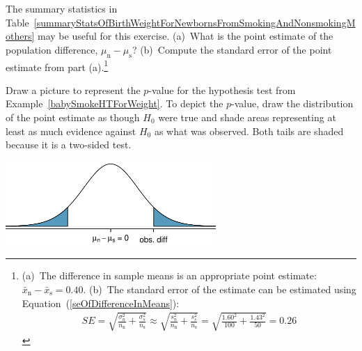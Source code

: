 \begin{exercise}
The summary statistics in Table~\ref{summaryStatsOfBirthWeightForNewbornsFromSmokingAndNonsmokingMothers} may be useful for this exercise. (a)~What is the point estimate of the population difference, $\mu_{\text{n}} - \mu_{\text{s}}$? (b)~Compute the standard error of the point estimate from part (a).\footnote{(a)~The difference in sample means is an appropriate point estimate: $\bar{x}_{\text{n}} - \bar{x}_{\text{s}} = 0.40$. (b)~The standard error of the estimate can be estimated using Equation~(\ref{seOfDifferenceInMeans}):
\begin{eqnarray*}
SE = \sqrt{\frac{\sigma_n^2}{n_\text{n}} + \frac{\sigma_s^2}{n_\text{s}}}
	\approx \sqrt{\frac{s_n^2}{n_\text{n}} + \frac{s_s^2}{n_\text{s}}}
	= \sqrt{\frac{1.60^2}{100} + \frac{1.43^2}{50}}
	= 0.26
\end{eqnarray*}}
\end{exercise}

\textC{\newpage}

\begin{example}{Draw a picture to represent the $p$-value for the hypothesis test from Example~\ref{babySmokeHTForWeight}.} \label{pictureOfPValueForEstimateOfDiffOfMeansOfBirthWeights}
To depict the $p$-value,  draw the distribution of the point estimate as though $H_0$ were true and shade areas representing at least as much evidence against $H_0$ as what was observed. Both tails are shaded because it is a two-sided test.
\begin{center}
\includegraphics[width=0.6\textwidth]{ch_inference_for_means_oi_biostat/figures/distOfDiffOfSampleMeansForBWOfBabySmokeData/distOfDiffOfSampleMeansForBWOfBabySmokeData}
\end{center}
\end{example}

